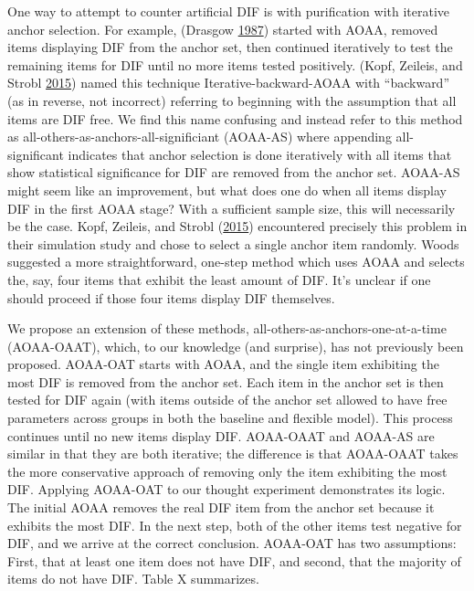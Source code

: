 \documentclass[
  11pt,
]{article}
\begin{document}
One way to attempt to counter artificial DIF is with purification with iterative anchor selection. For example, (Drasgow \protect\hyperlink{ref-drasgow1987study}{1987}) started with AOAA, removed items displaying DIF from the anchor set, then continued iteratively to test the remaining items for DIF until no more items tested positively. (Kopf, Zeileis, and Strobl \protect\hyperlink{ref-kopf2015framework}{2015}) named this technique Iterative-backward-AOAA with \enquote{backward} (as in reverse, not incorrect) referring to beginning with the assumption that all items are DIF free. We find this name confusing and instead refer to this method as all-others-as-anchors-all-significiant (AOAA-AS) where appending all-significant indicates that anchor selection is done iteratively with all items that show statistical significance for DIF are removed from the anchor set. AOAA-AS might seem like an improvement, but what does one do when all items display DIF in the first AOAA stage? With a sufficient sample size, this will necessarily be the case. Kopf, Zeileis, and Strobl (\protect\hyperlink{ref-kopf2015framework}{2015}) encountered precisely this problem in their simulation study and chose to select a single anchor item randomly. Woods suggested a more straightforward, one-step method which uses AOAA and selects the, say, four items that exhibit the least amount of DIF. It's unclear if one should proceed if those four items display DIF themselves.

We propose an extension of these methods, all-others-as-anchors-one-at-a-time (AOAA-OAAT), which, to our knowledge (and surprise), has not previously been proposed. AOAA-OAT starts with AOAA, and the single item exhibiting the most DIF is removed from the anchor set. Each item in the anchor set is then tested for DIF again (with items outside of the anchor set allowed to have free parameters across groups in both the baseline and flexible model). This process continues until no new items display DIF. AOAA-OAAT and AOAA-AS are similar in that they are both iterative; the difference is that AOAA-OAAT takes the more conservative approach of removing only the item exhibiting the most DIF. Applying AOAA-OAT to our thought experiment demonstrates its logic. The initial AOAA removes the real DIF item from the anchor set because it exhibits the most DIF. In the next step, both of the other items test negative for DIF, and we arrive at the correct conclusion. AOAA-OAT has two assumptions: First, that at least one item does not have DIF, and second, that the majority of items do not have DIF. Table X summarizes.
\end{document}

